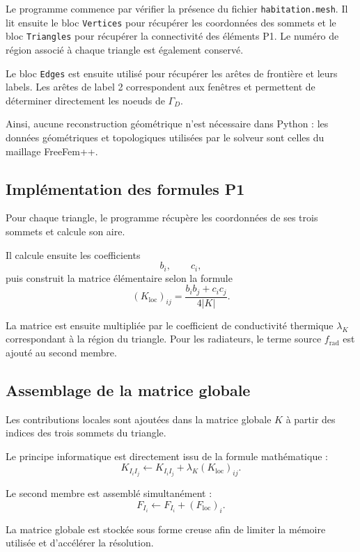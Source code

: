 \documentclass[12pt,a4paper]{article}
\begin{document}
	Le programme commence par vérifier la présence du fichier
	\texttt{habitation.mesh}. Il lit ensuite le bloc \texttt{Vertices} pour
	récupérer les coordonnées des sommets et le bloc \texttt{Triangles} pour
	récupérer la connectivité des éléments P1. Le numéro de région associé à
	chaque triangle est également conservé.
	
	Le bloc \texttt{Edges} est ensuite utilisé pour récupérer les arêtes de
	frontière et leurs labels. Les arêtes de label 2 correspondent aux
	fenêtres et permettent de déterminer directement les noeuds de
	\(\Gamma_D\).
	
	Ainsi, aucune reconstruction géométrique n'est nécessaire dans Python :
	les données géométriques et topologiques utilisées par le solveur sont
	celles du maillage FreeFem++.
	
	\subsection{Implémentation des formules P1}
	
	Pour chaque triangle, le programme récupère les coordonnées de ses trois
	sommets et calcule son aire.
	
	Il calcule ensuite les coefficients
	\[
	b_i,\qquad c_i,
	\]
	puis construit la matrice élémentaire selon la formule
	\[
	(K_{\mathrm{loc}})_{ij}
	=
	\frac{b_ib_j+c_ic_j}{4|K|}.
	\]
	
	La matrice est ensuite multipliée par le coefficient de conductivité thermique
	$\lambda_K$ correspondant à la région du triangle. Pour les radiateurs, le
	terme source $f_{\mathrm{rad}}$ est ajouté au second membre.
	
	\subsection{Assemblage de la matrice globale}
	
	Les contributions locales sont ajoutées dans la matrice globale $K$
	à partir des indices des trois sommets du triangle.
	
	Le principe informatique est directement issu de la formule
	mathématique :
	\[
	K_{I_iI_j}
	\leftarrow
	K_{I_iI_j}
	+
	\lambda_K(K_{\mathrm{loc}})_{ij}.
	\]
	
	Le second membre est assemblé simultanément :
	\[
	F_{I_i}
	\leftarrow
	F_{I_i}
	+
	(F_{\mathrm{loc}})_i.
	\]
	
	La matrice globale est stockée sous forme creuse afin de limiter la
	mémoire utilisée et d'accélérer la résolution.
	
\end{document}
